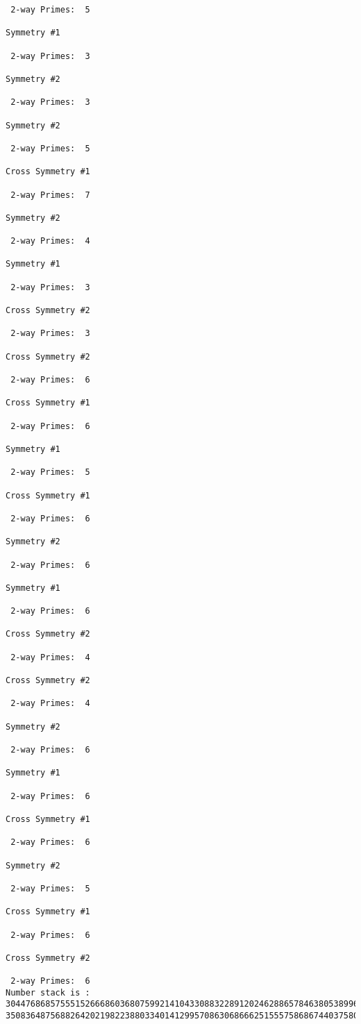 {{{{\begin{verbatim}
 2-way Primes: 	5

Symmetry #1

 2-way Primes: 	3

Symmetry #2

 2-way Primes: 	3

Symmetry #2

 2-way Primes: 	5

Cross Symmetry #1

 2-way Primes: 	7

Symmetry #2

 2-way Primes: 	4

Symmetry #1

 2-way Primes: 	3

Cross Symmetry #2

 2-way Primes: 	3

Cross Symmetry #2

 2-way Primes: 	6

Cross Symmetry #1

 2-way Primes: 	6

Symmetry #1

 2-way Primes: 	5

Cross Symmetry #1

 2-way Primes: 	6

Symmetry #2

 2-way Primes: 	6

Symmetry #1

 2-way Primes: 	6

Cross Symmetry #2

 2-way Primes: 	4

Cross Symmetry #2

 2-way Primes: 	4

Symmetry #2

 2-way Primes: 	6

Symmetry #1

 2-way Primes: 	6

Cross Symmetry #1

 2-way Primes: 	6

Symmetry #2

 2-way Primes: 	5

Cross Symmetry #1

 2-way Primes: 	6

Cross Symmetry #2

 2-way Primes: 	6
Number stack is :
30447686857555152666860368075992141043308832289120246288657846380538996794608835958544046240163340857
35083648756882642021982238803340141299570863068666251555758686744037580433610426404458595388064976998


\end{verbatim}}}}}

